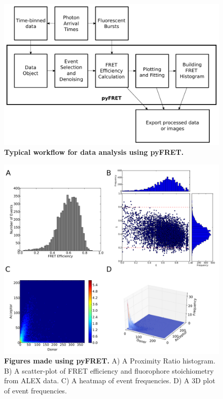 \documentclass[10pt]{article}
\begin{document}
\begin{figure}[!ht]
   \begin{center}
      \includegraphics*[clip=true, width=6in]{workflow_new.pdf}
      \caption{{\bf Typical workflow for data analysis using pyFRET.}}
      \label{fig:fig2_workflow}
   \end{center}
\end{figure}

\begin{figure}[!ht]
   \begin{center}
      \includegraphics*[clip=true, width=6in]{6bp_example.pdf}
      \caption{{\bf Figures made using pyFRET.} A) A Proximity Ratio histogram. B) A scatter-plot of FRET efficiency and fluorophore stoichiometry from ALEX data. C) A heatmap of event frequencies.  D) A 3D plot of event frequencies.}
      \label{fig:fig3_sample_results}
   \end{center}
\end{figure}
\end{document}
